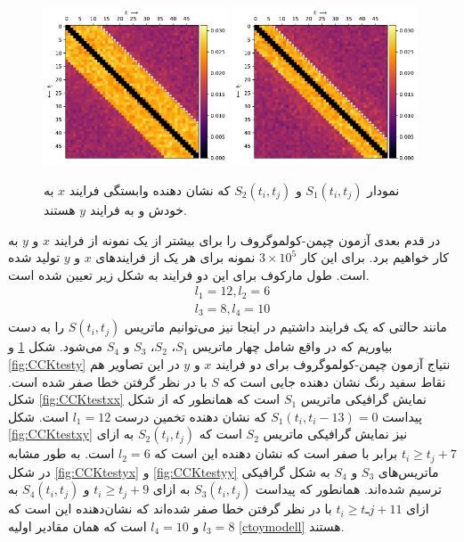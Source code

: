 \begin{figure}[H]
  \centering
  {\includegraphics[width=0.49\textwidth]{images/CCKtestxx.pdf}}
  {\includegraphics[width=0.49\textwidth]{images/CCKtestxy.pdf}}
  \caption{نمودار $S_{1}( t_i, t_j )$ و $S_{2}( t_i, t_j )$ که نشان دهنده وابستگی فرایند $x$ به خودش و به فرایند $y$ هستند.}\label{fig:CCKtestx}
\end{figure}
در قدم بعدی آزمون چپمن-کولموگروف را برای بیشتر از یک نمونه از فرایند $x$ و $y$ به کار خواهیم برد. برای این کار $3 \times 10^5$ 
نمونه برای هر یک از فرایندهای $x$ و $y$ تولید شده است.
طول مارکوف برای این دو فرایند به شکل زیر تعیین شده است.
\begin{equation}
  \begin{array}{l}
    l_1 = 12, l_2 = 6 \\
    l_3 = 8, l_4 = 10
  \end{array}
  \label{ctoymodell}
\end{equation}
مانند حالتی که یک فرایند داشتیم در اینجا نیز می‌توانیم ماتریس $S(t_i, t_j)$ را به دست بیاوریم که در واقع 
شامل چهار ماتریس $S_1$، $S_2$، $S_3$ و $S_4$ می‌شود.
 شکل \ref{fig:CCKtestx} و \ref{fig:CCKtesty} نتیاج آزمون چپمن-کولموگروف برای دو فرایند $x$ و $y$ 
 در این تصاویر هم نقاط سفید رنگ نشان دهنده جایی است که $S$ با در 
 نظر گرفتن خطا صفر شده است.
 شکل \ref{fig:CCKtestxx} نمایش گرافیکی ماتریس $S_1$ است که 
 همانطور که از شکل پیداست $S_1( t_i, t_i - 13) = 0$ که نشان دهنده 
 تخمین درست $l_1 = 12$ است. شکل \ref{fig:CCKtestxy} نیز نمایش گرافیکی ماتریس $S_2$ است 
 که $S_2( t_i, t_j ) $ به ازای $t_i \geq t_j + 7$ برابر با صفر است که نشان دهنده این است که 
 $l_2 = 6$ است. به طور مشابه در شکل \ref{fig:CCKtestyx} و \ref{fig:CCKtestyy} ماتریس‌های $S_3$ و $S_4$ 
 به شکل گرافیکی ترسیم شده‌اند. همانطور که پیداست $S_3( t_i, t_j )$ به ازای $t_i \geq t_j + 9$ و 
$S_4( t_i, t_j )$ به ازای $t_i \geq tـj + 11$ با در نظر گرفتن خطا صفر شده‌اند که نشان‌دهنده 
این است که $l_3 = 8$ و $l_4 = 10$ است که همان مقادیر اولیه \ref{ctoymodell} هستند.
 
